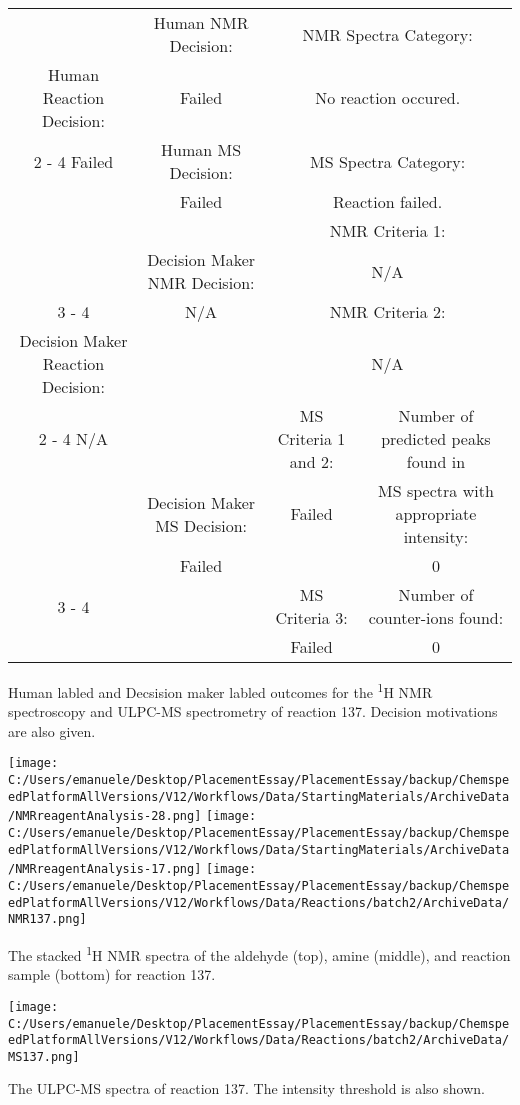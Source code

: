 \documentclass{article}%
\begin{document}
\begin{Decision Table}[H]%
\begin{tabular}{|c|c|c|c|}%
\hline%
&Human NMR Decision:&\multicolumn{2}{|c|}{NMR Spectra Category:}\\%
Human Reaction Decision:&Failed&\multicolumn{2}{|c|}{No reaction occured.}\\%
\cline{2%
-%
4}%
Failed&Human MS Decision:&\multicolumn{2}{|c|}{MS Spectra Category:}\\%
&Failed&\multicolumn{2}{|c|}{Reaction failed.}\\%
\hline%
&&\multicolumn{2}{|c|}{NMR Criteria 1:}\\%
&Decision Maker NMR Decision:&\multicolumn{2}{|c|}{N/A}\\%
\cline{3%
-%
4}%
&N/A&\multicolumn{2}{|c|}{NMR Criteria 2:}\\%
Decision Maker Reaction Decision:&&\multicolumn{2}{|c|}{N/A}\\%
\cline{2%
-%
4}%
N/A&&MS Criteria 1 and 2:&Number of predicted peaks found in\\%
&Decision Maker MS Decision:&Failed&MS spectra with appropriate intensity:\\%
&Failed&&0\\%
\cline{3%
-%
4}%
&&MS Criteria 3:&Number of counter{-}ions found:\\%
&&Failed&0\\%
\hline%
\end{tabular}%
\caption{Human labled and Decsision maker labled outcomes for the \textsuperscript{1}H NMR spectroscopy and ULPC-MS spectrometry of reaction 137. Decision motivations are also given.}%
\end{Decision Table}%
\begin{NMR Spectra}[H]%
\begin{center}%
\texttt{[image: C:/Users/emanuele/Desktop/PlacementEssay/PlacementEssay/backup/ChemspeedPlatformAllVersions/V12/Workflows/Data/StartingMaterials/ArchiveData/NMRreagentAnalysis-28.png]}\hfill%
\texttt{[image: C:/Users/emanuele/Desktop/PlacementEssay/PlacementEssay/backup/ChemspeedPlatformAllVersions/V12/Workflows/Data/StartingMaterials/ArchiveData/NMRreagentAnalysis-17.png]}\hfill%
\texttt{[image: C:/Users/emanuele/Desktop/PlacementEssay/PlacementEssay/backup/ChemspeedPlatformAllVersions/V12/Workflows/Data/Reactions/batch2/ArchiveData/NMR137.png]}\hfill%
\end{center}%
\caption{The stacked \textsuperscript{1}H NMR spectra of the aldehyde (top), amine (middle), and reaction sample (bottom) for reaction 137.}%
\end{NMR Spectra}%
\begin{MS Spectra}[H]%
\begin{center}%
\texttt{[image: C:/Users/emanuele/Desktop/PlacementEssay/PlacementEssay/backup/ChemspeedPlatformAllVersions/V12/Workflows/Data/Reactions/batch2/ArchiveData/MS137.png]}\hfill%
\end{center}%
\caption{The ULPC-MS spectra of reaction 137. The intensity threshold is also shown.}%
\end{MS Spectra}%
\end{document}
